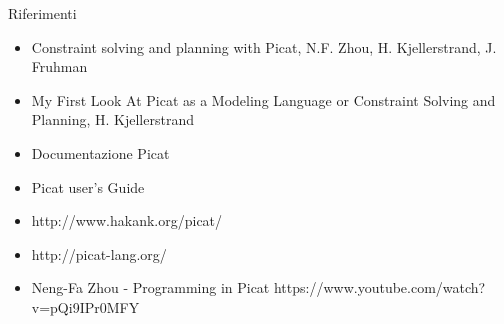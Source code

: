 \begin{frame}{Riferimenti}

	\begin{itemize}
		\item Constraint solving and planning with Picat, N.F. Zhou, H. Kjellerstrand, J. Fruhman
		\item My First Look At Picat as a Modeling Language or Constraint Solving and Planning, H. Kjellerstrand
		\item Documentazione Picat
		\item Picat user's Guide
		\item http://www.hakank.org/picat/
		\item http://picat-lang.org/
		\item Neng-Fa Zhou - Programming in Picat https://www.youtube.com/watch?v=pQi9IPr0MFY
	\end{itemize}
	
\end{frame}
